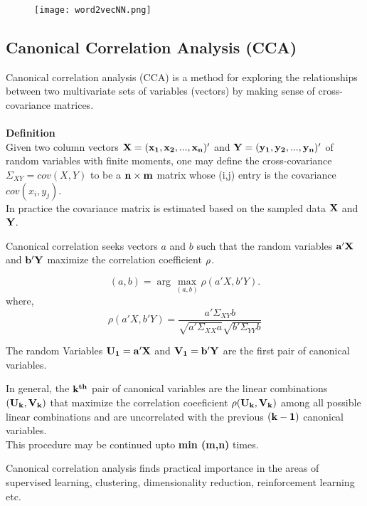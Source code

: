 \documentclass{article} %
\begin{document}
\begin{figure}[H]
\texttt{[image: word2vecNN.png]}
\end{figure}

\subsection{Canonical Correlation Analysis (CCA)}

Canonical correlation analysis (CCA) is a method for exploring the relationships between two multivariate sets of variables (vectors) by making sense of cross-covariance matrices.
\\\\
{\bf Definition}\\
Given two column vectors $\bf{{X} = (x_1, x_2,..., x_n)'}$ and  $\bf{{Y} = (y_1, y_2,..., y_n)'}$ of random variables with finite moments, one may define the cross-covariance ${\Sigma_{XY}} = cov({X},{Y})$ to be a ${{\bf n}\times{\bf m}}$ matrix whose (i,j) entry is the covariance $cov(x_i,y_j)$.\\
In practice the covariance matrix is estimated based on the sampled data $\bf{X}$ and $\bf{Y}$.


Canonical correlation seeks vectors ${a}$ and ${b}$ such that the random variables $\bf{a'X}$ and $\bf{b'Y}$ maximize the correlation coefficient ${\bf \rho}$.

\begin{equation}
		(a,b) = \arg \max_{(a,b)} {\rho}({a'X},{b'Y}).
\end{equation}
where,
\begin{equation}	
	\rho({a'X},{b'Y}) = \frac{a' \Sigma_{XY} b}{\sqrt{a'\Sigma_{XX}a}\sqrt{b'\Sigma_{YY}b}}	
\end{equation}

The random Variables $\bf{U_1 = a'X}$ and $\bf{V_1 = b'Y}$ are the first pair of canonical variables.

In general, the $\bf{k^{th}}$ pair of canonical variables are the linear combinations $(\bf{U_k,V_k})$ that maximize the correlation coeeficient $\bf{\rho}(\bf{U_k,V_k})$ among all possible linear combinations and are uncorrelated with the previous $\bf{(k-1)}$ canonical variables.\\
This procedure may be continued upto {\bf{min (m,n)}} times.

Canonical correlation analysis finds practical importance in the areas of supervised learning, clustering, dimensionality reduction, reinforcement learning etc.
\end{document}
